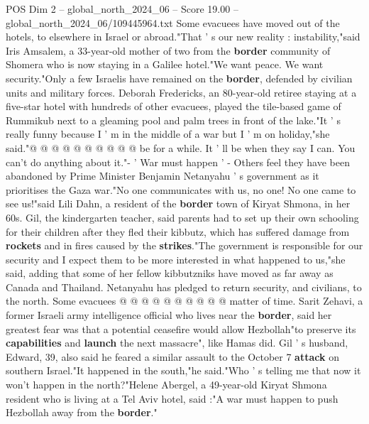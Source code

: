 \begin{textsample}{POS Dim 2 – global\_north\_2024\_06 – Score 19.00 – global\_north\_2024\_06/109445964.txt}
Some evacuees have moved out of the hotels, to elsewhere in Israel or abroad."That ' s our new reality : instability,"said Iris Amsalem, a 33-year-old mother of two from the \textbf{border} community of Shomera who is now staying in a Galilee hotel."We want peace.
We want security."Only a few Israelis have remained on the \textbf{border}, defended by civilian units and military forces.
Deborah Fredericks, an 80-year-old retiree staying at a five-star hotel with hundreds of other evacuees, played the tile-based game of Rummikub next to a gleaming pool and palm trees in front of the lake."It ' s really funny because I ' m in the middle of a war but I ' m on holiday,"she said."@ @ @ @ @ @ @ @ @ @ be for a while.
It ' ll be when they say I can.
You can't do anything about it."- ' War must happen ' - Others feel they have been abandoned by Prime Minister Benjamin Netanyahu ' s government as it prioritises the Gaza war."No one communicates with us, no one!
No one came to see us!"said Lili Dahn, a resident of the \textbf{border} town of Kiryat Shmona, in her 60s.
Gil, the kindergarten teacher, said parents had to set up their own schooling for their children after they fled their kibbutz, which has suffered damage from \textbf{rockets} and in fires caused by the \textbf{strikes}."The government is responsible for our security and I expect them to be more interested in what happened to us,"she said, adding that some of her fellow kibbutzniks have moved as far away as Canada and Thailand.
Netanyahu has pledged to return security, and civilians, to the north.
Some evacuees @ @ @ @ @ @ @ @ @ @ matter of time.
Sarit Zehavi, a former Israeli army intelligence official who lives near the \textbf{border}, said her greatest fear was that a potential ceasefire would allow Hezbollah"to preserve its \textbf{capabilities} and \textbf{launch} the next massacre", like Hamas did.
Gil ' s husband, Edward, 39, also said he feared a similar assault to the October 7 \textbf{attack} on southern Israel."It happened in the south,"he said."Who ' s telling me that now it won't happen in the north?"Helene Abergel, a 49-year-old Kiryat Shmona resident who is living at a Tel Aviv hotel, said :"A war must happen to push Hezbollah away from the \textbf{border}."

\end{textsample}
